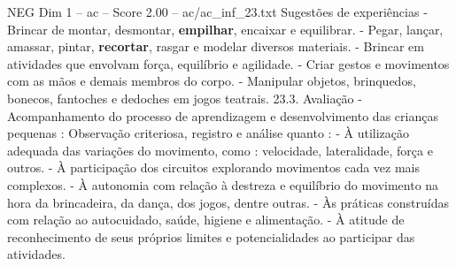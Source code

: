 \begin{textsample}{NEG Dim 1 – ac – Score 2.00 – ac/ac\_inf\_23.txt}
Sugestões de experiências - Brincar de montar, desmontar, \textbf{empilhar}, encaixar e equilibrar. - Pegar, lançar, amassar, pintar, \textbf{recortar}, rasgar e modelar diversos materiais. - Brincar em atividades que envolvam força, equilíbrio e agilidade. - Criar gestos e movimentos com as mãos e demais membros do corpo. - Manipular objetos, brinquedos, bonecos, fantoches e dedoches em jogos teatrais. 23.3.
Avaliação - Acompanhamento do processo de aprendizagem e desenvolvimento das crianças pequenas : Observação criteriosa, registro e análise quanto : - À utilização adequada das variações do movimento, como : velocidade, lateralidade, força e outros. - À participação dos circuitos explorando movimentos cada vez mais complexos. - À autonomia com relação à destreza e equilíbrio do movimento na hora da brincadeira, da dança, dos jogos, dentre outras. - Às práticas construídas com relação ao autocuidado, saúde, higiene e alimentação. - À atitude de reconhecimento de seus próprios limites e potencialidades ao participar das atividades.

\end{textsample}
